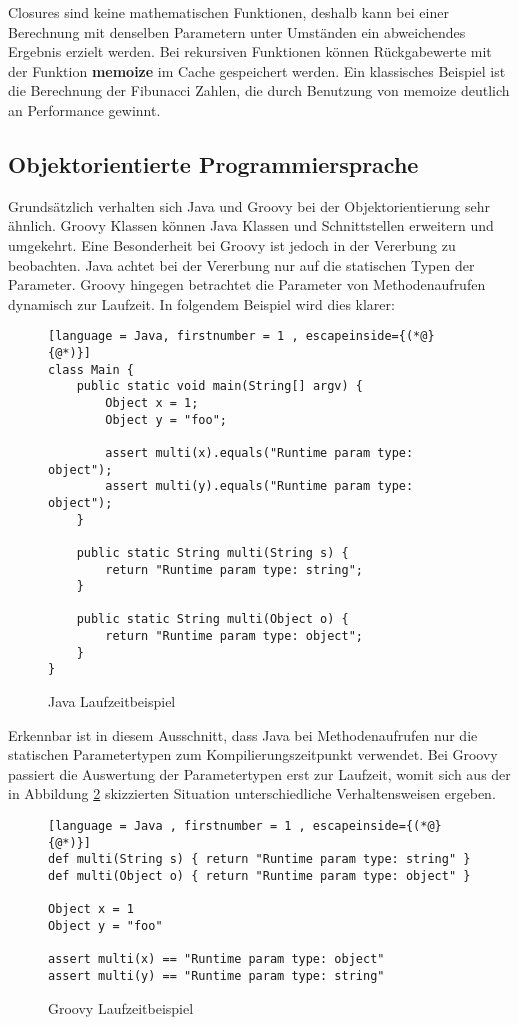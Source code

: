 
Closures sind keine mathematischen Funktionen, deshalb kann bei einer Berechnung mit denselben Parametern unter Umständen ein abweichendes Ergebnis erzielt werden. 
Bei rekursiven Funktionen können Rückgabewerte mit der Funktion \textbf{memoize} im Cache gespeichert werden. 
Ein klassisches Beispiel ist die Berechnung der Fibunacci Zahlen, die durch Benutzung von memoize deutlich an Performance gewinnt.


\subsection{Objektorientierte Programmiersprache}
Grundsätzlich verhalten sich Java und Groovy bei der Objektorientierung sehr ähnlich. 
Groovy Klassen können Java Klassen und Schnittstellen erweitern und umgekehrt.
Eine Besonderheit bei Groovy ist jedoch in der Vererbung zu beobachten.
Java achtet bei der Vererbung nur auf die statischen Typen der Parameter. 
Groovy hingegen betrachtet die Parameter von Methodenaufrufen dynamisch zur Laufzeit. 
In folgendem Beispiel wird dies klarer:


\begin{figure}[hbt!]
\begin{lstlisting}[language = Java, firstnumber = 1 , escapeinside={(*@}{@*)}]
class Main {
	public static void main(String[] argv) {
		Object x = 1;
		Object y = "foo";
		
		assert multi(x).equals("Runtime param type: object");
		assert multi(y).equals("Runtime param type: object");
	}
	
	public static String multi(String s) {
		return "Runtime param type: string";
	}
	
	public static String multi(Object o) {
		return "Runtime param type: object";
	}
}
\end{lstlisting}

\caption{Java Laufzeitbeispiel}
\label{code:java-runtime}
\end{figure}


Erkennbar ist in diesem Ausschnitt, dass Java bei Methodenaufrufen nur die statischen Parametertypen zum Kompilierungszeitpunkt verwendet.
Bei Groovy passiert die Auswertung der Parametertypen erst zur Laufzeit, womit sich aus der in Abbildung \ref{code:groovy-runtime} skizzierten Situation unterschiedliche Verhaltensweisen ergeben.


\begin{figure}[hbt!]
\begin{lstlisting}[language = Java , firstnumber = 1 , escapeinside={(*@}{@*)}]
def multi(String s) { return "Runtime param type: string" }
def multi(Object o) { return "Runtime param type: object" }

Object x = 1
Object y = "foo"

assert multi(x) == "Runtime param type: object"
assert multi(y) == "Runtime param type: string"
\end{lstlisting}

\caption{Groovy Laufzeitbeispiel}
\label{code:groovy-runtime}
\end{figure}


